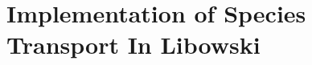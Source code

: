 \chapter{Implementation of Species Transport In Libowski}\label{ch:implimentation_of_species_transport}

